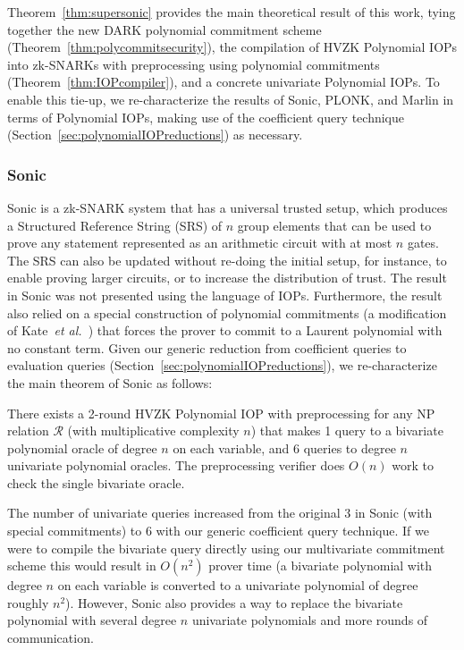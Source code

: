 Theorem~\ref{thm:supersonic} provides the main theoretical result of this work, tying together the new DARK polynomial commitment scheme (Theorem~\ref{thm:polycommitsecurity}), the compilation of HVZK Polynomial IOPs into zk-SNARKs with preprocessing using polynomial commitments (Theorem~\ref{thm:IOPcompiler}), and a concrete univariate Polynomial IOPs. To enable this tie-up, we re-characterize the results of \textsf{Sonic}, \textsf{PLONK}, and \textsf{Marlin} in terms of Polynomial IOPs, making use of the coefficient query technique (Section~\ref{sec:polynomialIOPreductions}) as necessary.

\subsubsection{Sonic} 
\textsf{Sonic} is a zk-SNARK system that has a universal trusted setup, which produces a Structured Reference String (SRS) of $n$ group elements that can be used to prove any statement represented as an arithmetic circuit with at most $n$ gates. The SRS can also be updated without re-doing the initial setup, for instance, to enable proving larger circuits, or to increase the distribution of trust. The result in \textsf{Sonic} was not presented using the language of IOPs. Furthermore, the result also relied on a special construction of polynomial commitments (a modification of Kate~\emph{et al.}~\cite{AC:KatZavGol10}) that forces the prover to commit to a Laurent polynomial with no constant term. Given our generic reduction from coefficient queries to evaluation queries (Section~\ref{sec:polynomialIOPreductions}), we re-characterize the main theorem of \textsf{Sonic} as follows: 

\begin{theorem}
There exists a 2-round HVZK Polynomial IOP with preprocessing for any NP relation $\mathcal{R}$ (with multiplicative complexity $n$) that makes 1 query to a bivariate polynomial oracle of degree $n$ on each variable, and 6 queries to degree $n$ univariate polynomial oracles. The preprocessing verifier does $O(n)$ work to check the single bivariate oracle. 
\end{theorem}

The number of univariate queries increased from the original $3$ in \textsf{Sonic} (with special commitments) to $6$ with our generic coefficient query technique. If we were to compile the bivariate query directly using our multivariate commitment scheme this would result in $O(n^2)$ prover time (a bivariate polynomial with degree $n$ on each variable is converted to a univariate polynomial of degree roughly $n^2$). However, \textsf{Sonic} also provides a way to replace the bivariate polynomial with several degree $n$ univariate polynomials and more rounds of communication. 
\fi

